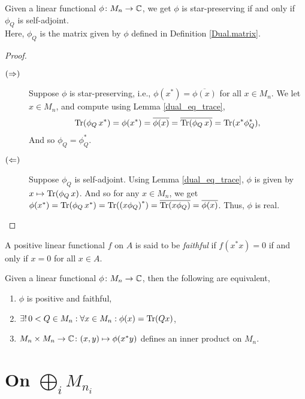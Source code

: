   \begin{proposition}\label{Module.Dual.isReal_iff}\leanok
   Given a linear functional $\phi\colon{M_n}\to\mathbb{C}$, we get $\phi$ is star-preserving if and only if $\phi_Q$ is self-adjoint.\\
   Here, $\phi_Q$ is the matrix given by $\phi$ defined in Definition \ref{Dual.matrix}.
  \end{proposition}
  \begin{proof}\leanok {\ }
   \begin{description}
    \item[$(\Rightarrow)$]
     Suppose $\phi$ is star-preserving, i.e., $\phi(x^*)=\overline{\phi(x)}$ for all $x\in{M_n}$.
     We let $x\in{M_n}$, and compute using Lemma \ref{dual_eq_trace},
     \[\operatorname{Tr}(\phi_Q\, x^*)=\phi(x^*)=\overline{\phi(x)}=\overline{\operatorname{Tr}(\phi_Q\, x)}=\operatorname{Tr}(x^*\phi_Q^*),\]
     And so $\phi_Q=\phi_Q^*$.
    \item[$(\Leftarrow)$]
     Suppose $\phi_Q$ is self-adjoint. Using Lemma \ref{dual_eq_trace}, $\phi$ is given by $x\mapsto\operatorname{Tr}(\phi_Q\, x)$.
     And so for any $x\in{M_n}$, we get $\phi(x^*)=\operatorname{Tr}(\phi_Q\, x^*)=\operatorname{Tr}({(x\phi_Q)}^*)=\overline{\operatorname{Tr}(x\phi_Q)}=\overline{\phi(x)}$.
     Thus, $\phi$ is real.
   \end{description}
  \end{proof}

  \begin{definition}\label{IsFaithful}\leanok
   A positive linear functional $f$ on $A$ is said to be \textit{faithful} if $f(x^*x)=0$ if and only if $x=0$ for all $x\in A$.
  \end{definition}

  \begin{theorem}\label{Dual.isFaithfulPosMap_tfae}
   Given a linear functional $\phi\colon{M_n}\to\mathbb{C}$, then the following are equivalent,
   \begin{enumerate}[label=(\roman*)]
    \item $\phi$ is positive and faithful,
    \item $\exists!\,0<Q\in{M_n}:\forall{x}\in{M_n}:\phi(x)=\operatorname{Tr}(Qx)$,
    \item $M_n\times{M_n}\to\mathbb{C}\colon(x,y)\mapsto\phi(x^*y)$ defines an inner product on $M_n$.
   \end{enumerate}
  \end{theorem}

 \section{On $\bigoplus_i M_{n_i}$}
  
 


 